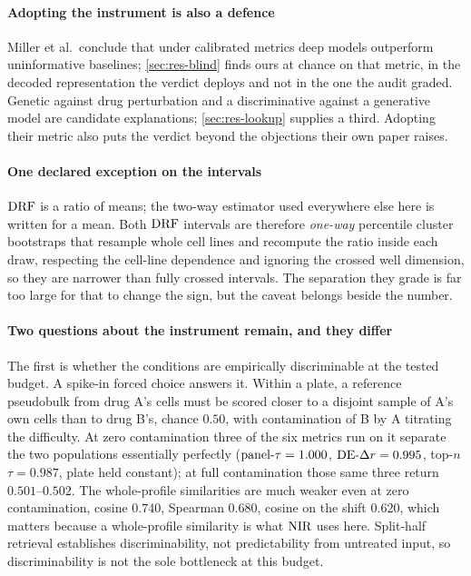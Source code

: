 \paragraph{Adopting the instrument is also a defence} Miller et al.\ conclude
that under calibrated metrics deep models outperform uninformative baselines;
\cref{sec:res-blind} finds ours at chance on that metric, in the decoded
representation the verdict deploys and not in the one the audit
graded.
Genetic against drug perturbation and a discriminative against a generative
model are candidate explanations; \cref{sec:res-lookup} supplies a third.
Adopting their metric also puts the verdict beyond the objections their own
paper raises.

\paragraph{One declared exception on the intervals} $\textrm{DRF}$ is a ratio of means;
the two-way estimator used everywhere else here is written for a
mean. Both $\textrm{DRF}$ intervals are therefore
\emph{one-way} percentile cluster bootstraps that resample whole cell lines and
recompute the ratio inside each draw, respecting the cell-line dependence and
ignoring the crossed well dimension, so they are narrower than fully crossed
intervals. The separation they grade is far too large for that to change the
sign, but the caveat belongs beside the number.

\paragraph{Two questions about the instrument remain, and they differ} The first
is whether the conditions are empirically discriminable at the tested budget. A
spike-in forced choice answers it. Within a plate, a reference pseudobulk from
drug A's cells must be scored closer to a disjoint sample of A's own cells than
to drug B's, chance $0.50$, with contamination of B by A titrating the
difficulty. At zero contamination three of the six metrics run on it
separate the two populations essentially perfectly ($\textrm{panel-}\tau = 1.000$,
$\textrm{DE-}\Delta r = 0.995$, top-$n$ $\tau = 0.987$, plate held constant); at full
contamination those same three return $0.501$--$0.502$. The whole-profile
similarities are much weaker even at zero contamination, cosine $0.740$,
Spearman $0.680$, cosine on the shift $0.620$, which matters because a
whole-profile similarity is what $\textrm{NIR}$ uses here. Split-half retrieval
establishes discriminability, not predictability from untreated input, so
discriminability is not the sole bottleneck at this budget.

